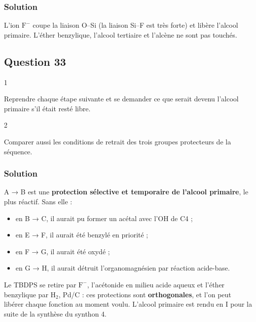 \documentclass[11pt,a4paper]{article}
\providecommand{\tightlist}{\setlength{\itemsep}{0pt}\setlength{\parskip}{0pt}}
\newcommand{\equationajustee}[1]{%
  \sbox{\boiteequation}{$\displaystyle #1$}%
  \ifdim\wd\boiteequation>\linewidth
    \[\resizebox{\linewidth}{!}{\usebox{\boiteequation}}\]%
  \else
    \[#1\]%
  \fi}
\begin{document}
\hypertarget{solution-31}{%
\subsubsection{Solution}\label{solution-31}}

L'ion \(\mathrm{F^-}\) coupe la liaison O--Si (la liaison Si--F est très forte) et libère l'alcool primaire. L'éther benzylique, l'alcool tertiaire et l'alcène ne sont pas touchés.

\equationajustee{\boxed{\mathbf I:\ \text{H avec }\mathrm{CH_2OTBDPS}\to\mathrm{CH_2OH}}}

\hypertarget{question-33}{%
\subsection{Question 33}\label{question-33}}

\begin{indication}{1}

Reprendre chaque étape suivante et se demander ce que serait devenu l'alcool primaire s'il était resté libre.

\end{indication}

\begin{indication}{2}

Comparer aussi les conditions de retrait des trois groupes protecteurs de la séquence.

\end{indication}

\hypertarget{solution-32}{%
\subsubsection{Solution}\label{solution-32}}

A → B est une \textbf{protection sélective et temporaire de l'alcool primaire}, le plus réactif. Sans elle :

\begin{itemize}
\tightlist
\item
  en B → C, il aurait pu former un acétal avec l'OH de C4 ;
\item
  en E → F, il aurait été benzylé en priorité ;
\item
  en F → G, il aurait été oxydé ;
\item
  en G → H, il aurait détruit l'organomagnésien par réaction acide-base.
\end{itemize}

Le TBDPS se retire par \(\mathrm{F^-}\), l'acétonide en milieu acide aqueux et l'éther benzylique par \(\mathrm{H_2}\), Pd/C : ces protections sont \textbf{orthogonales}, et l'on peut libérer chaque fonction au moment voulu. L'alcool primaire est rendu en I pour la suite de la synthèse du synthon 4.
\end{document}
